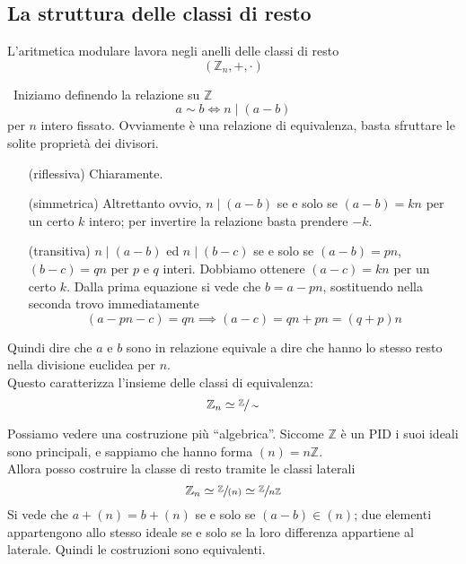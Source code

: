 \subsection{La struttura delle classi di resto}
L'aritmetica modulare lavora negli anelli delle classi di resto
\begin{equation*}
\left(\mathbb{Z}_n,+,\cdot\right)
\end{equation*}
\begin{osservazione}\
	Iniziamo definendo la relazione su $\mathbb{Z}$ 
	\begin{equation*}
	a\sim b \iff n \mid (a-b) 
	\end{equation*}
	per $n$ intero fissato. Ovviamente è una relazione di equivalenza, basta sfruttare le solite proprietà dei divisori. 
	\begin{itemize}
		\item[(riflessiva)] Chiaramente.
		\item[(simmetrica)] Altrettanto ovvio, $n\mid(a-b)$ se e solo se $(a-b)=kn$ per un certo $k$ intero; per invertire la relazione basta prendere $-k$.
		\item[(transitiva)] $n\mid(a-b)$ ed $n\mid(b-c)$ se e solo se $(a-b)=pn$, $(b-c)=qn$ per $p$ e $q$ interi. Dobbiamo ottenere $(a-c)=kn$ per un certo $k$. Dalla prima equazione si vede che $b=a-pn$, sostituendo nella seconda trovo immediatamente
		\begin{equation*}
		(a-pn-c)=qn\implies (a-c)=qn+pn=(q+p)n
		\end{equation*}
	\end{itemize}
	Quindi dire che $a$ e $b$ sono in relazione equivale a dire che hanno lo stesso resto nella divisione euclidea per $n$. \\ Questo caratterizza l'insieme delle classi di equivalenza:
	\begin{equation*}
	\mathbb{Z}_n \simeq \sfrac{\mathbb{Z}}{\sim}
	\end{equation*}
\end{osservazione}
\begin{osservazione}
	Possiamo vedere una costruzione più \enquote{algebrica}. Siccome $\mathbb{Z}$ è un PID i suoi ideali sono principali, e sappiamo che hanno forma $(n)=n\mathbb{Z}$. \\ Allora posso costruire la classe di resto tramite le classi laterali
		\begin{equation*}
		\mathbb{Z}_n\simeq\sfrac{\mathbb{Z}}{(n)}\simeq\sfrac{\mathbb{Z}}{n\mathbb{Z}}
		\end{equation*}
		Si vede che $a+(n)=b+(n)$ se e solo se $(a-b)\in(n)$; due elementi appartengono allo stesso ideale se e solo se la loro differenza appartiene al laterale. Quindi le costruzioni sono equivalenti.

\end{osservazione}
